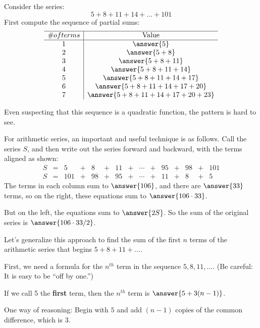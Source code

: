 \documentclass[nooutcomes]{ximera}
\begin{document}
\begin{problem}
Consider the series: 
\[
5+8+11+14+\dots+101
\]
First compute the sequence of partial sums: 
\[
\begin{array}{c|c} \hline
\# of terms & \text{Value} \\ \hline
1 & \answer{5} \\
2 & \answer{5+8} \\
3 & \answer{5+8+11}\\
4 & \answer{5+8+11+14}\\
5 & \answer{5+8+11+14+17}\\
6 & \answer{5+8+11+14+17+20}\\
7 & \answer{5+8+11+14+17+20+23}\\
\end{array}
\]

\begin{problem}
Even suspecting that this sequence is a quadratic function, the pattern is hard to see.  

For arithmetic series, an important and useful technique is as follows. Call the series $S$, and then write out the series forward and backward, with the terms aligned as shown:  
\[
\begin{array}{ccccccccccccccc}
S & = &     5  & + & 8      & + &  11    & + & \cdots & + & 95 & + & 98 & + & 101 \\
S & = & 101 & + & 98 & + & 95 & + & \cdots & + & 11     & + &    8   & + & 5
\end{array}
\]
The terms in each column sum to $\answer{106}$, and there are $\answer{33}$ terms, so on the right, these equations sum to $\answer{106\cdot 33}$.  

But on the left, the equations sum to $\answer{2S}$.  So the sum of the original series is 
$\answer{106\cdot 33/2}$. 

\begin{problem}
Let's generalize this approach to find the sum of the first $n$ terms of the arithmetic series that begins $5+8+11+\dots$.  

First, we need a formula for the $n^{th}$ term in the sequence $5, 8, 11, \dots$.  (Be careful:  It is easy to be ``off by one.'')

If we call 5 the \textbf{first} term, then the $n^{th}$ term is $\answer{5+3(n-1)}$.  
\begin{feedback}
One way of reasoning:  Begin with $5$ and add $(n-1)$ copies of the common difference, which is $3$.  
\end{feedback}


\end{problem}
\end{problem}
\end{problem}
\end{document}
